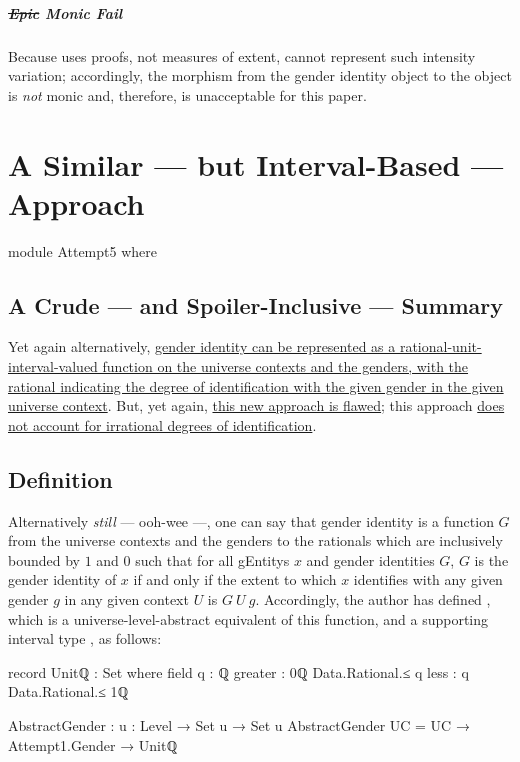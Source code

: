 \documentclass{article}
\theoremstyle{remark}
\newcommand{\summaryLink}[2]{\hyperref[#1]{#2}}
\begin{document}
\subparagraph{\st{Epic} Monic Fail}
Because  uses proofs, not measures of extent,  cannot represent such intensity variation; accordingly, the morphism from the gender identity object to the  object is \emph{not} monic and, therefore, is unacceptable for this paper.

\section{A Similar --- but Interval-Based --- Approach}\label{sec:gender5}

\begin{code}
module Attempt5 where
\end{code}

\subsection{A Crude --- and Spoiler-Inclusive --- Summary}
Yet again alternatively, \summaryLink{sec:gender5definition}{gender identity can be represented as a rational-unit-interval-valued function on the universe contexts and the genders, with the rational indicating the degree of identification with the given gender in the given universe context}.  But, yet again, \summaryLink{sec:gender5flaws}{this new approach is flawed}; this approach \summaryLink{enum:gender5flawsIrrational}{does not account for irrational degrees of identification}.

\subsection{Definition}\label{sec:gender5definition}
Alternatively \emph{still} --- ooh-wee ---, one can say that gender identity is a function \(G\) from the universe contexts and the genders to the rationals which are inclusively bounded by \(1\) and \(0\) such that for all \glspl{gEntity} \(x\) and gender identities \(G\), \(G\) is the gender identity of \(x\) if and only if the extent to which \(x\) identifies with any given gender \(g\) in any given context \(U\) is \(G\ U\ g\).  Accordingly, the author has defined , which is a universe-level-abstract equivalent of this function, and a supporting interval type , as follows:

\begin{code}
  record Unitℚ : Set where
    field
      q : ℚ
      greater : 0ℚ Data.Rational.≤ q
      less : q Data.Rational.≤ 1ℚ

  AbstractGender : {u : Level} → Set u → Set u
  AbstractGender UC = UC → Attempt1.Gender → Unitℚ
\end{code}
\end{document}
